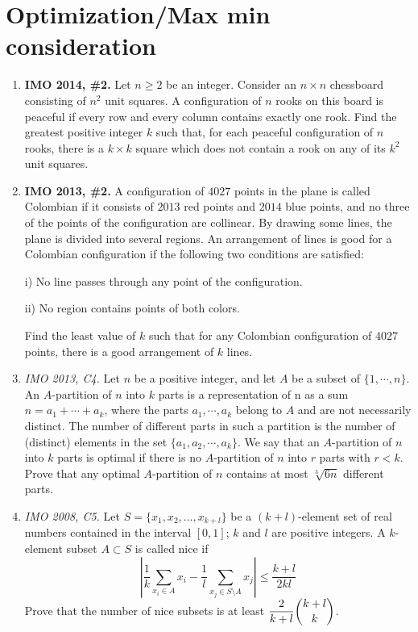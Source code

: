 \documentclass[11pt,a4paper]{article}
\begin{document}
\section{Optimization/Max min consideration}
\begin{enumerate}
\item\textbf{IMO 2014, \#2.} Let $n \ge 2$ be an integer. Consider an $n \times n$ chessboard consisting of $n^2$ unit squares. A configuration of $n$ rooks on this board is peaceful if every row and every column contains exactly one rook. Find the greatest positive integer $k$ such that, for each peaceful configuration of $n$ rooks, there is a $k \times k$ square which does not contain a rook on any of its $k^2$ unit squares.

\item\textbf{IMO 2013, \#2.} A configuration of $4027$ points in the plane is called Colombian if it consists of $2013$ red points and $2014$ blue points, and no three of the points of the configuration are collinear. By drawing some lines, the plane is divided into several regions. An arrangement of lines is good for a Colombian configuration if the following two conditions are satisfied:

i) No line passes through any point of the configuration.

ii) No region contains points of both colors.

Find the least value of $k$ such that for any Colombian configuration of $4027$ points, there is a good arrangement of $k$ lines.

\item\emph{IMO 2013, C4.} Let $n$ be a positive integer, and let $A$ be a subset of $\{ 1,\cdots ,n\}$. An $A$-partition of $n$ into $k$ parts is a representation of n as a sum $n = a_1 + \cdots + a_k$, where the parts $a_1 , \cdots , a_k $ belong to $A$ and are not necessarily distinct. The number of different parts in such a partition is the number of (distinct) elements in the set $\{ a_1 , a_2 , \cdots , a_k \} $.
We say that an $A$-partition of $n$ into $k$ parts is optimal if there is no $A$-partition of $n$ into $r$ parts with $r<k$. Prove that any optimal $A$-partition of $n$ contains at most $\sqrt[3]{6n}$ different parts.

\item\emph{IMO 2008, C5.} Let $ S = \{x_1, x_2, \ldots, x_{k + l}\}$ be a $ (k + l)$-element set of real numbers contained in the interval $ [0, 1]$; $ k$ and $ l$ are positive integers. A $ k$-element subset $ A\subset S$ is called nice if
\[ \left |\frac {1}{k}\sum_{x_i\in A} x_i - \frac {1}{l}\sum_{x_j\in S\setminus A} x_j\right |\le \frac {k + l}{2kl}\]
Prove that the number of nice subsets is at least $ \dfrac{2}{k + l}\dbinom{k + l}{k}$.


\end{enumerate}
\end{document}
